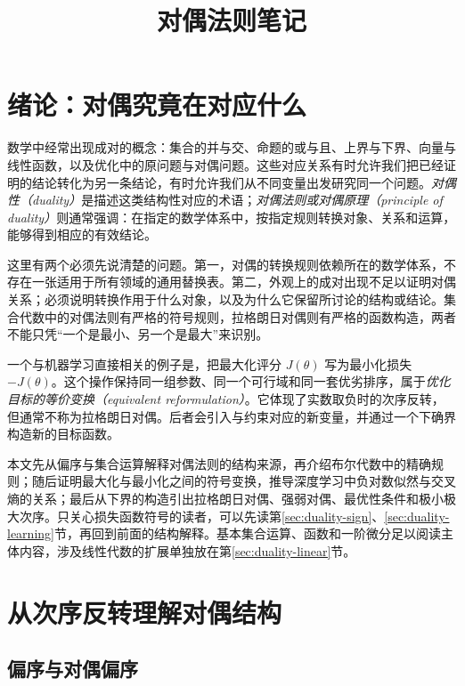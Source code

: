 \documentclass[UTF8,12pt,a4paper,fontset=fandol]{ctexart}
\title{对偶法则笔记}
\author{}
\date{}
\begin{document}
\maketitle
\tableofcontents

\section{绪论：对偶究竟在对应什么}
\label{sec:duality-introduction}

数学中经常出现成对的概念：集合的并与交、命题的或与且、上界与下界、向量与线性函数，以及优化中的原问题与对偶问题。这些对应关系有时允许我们把已经证明的结论转化为另一条结论，有时允许我们从不同变量出发研究同一个问题。\emph{对偶性（duality）}是描述这类结构性对应的术语；\emph{对偶法则或对偶原理（principle of duality）}则通常强调：在指定的数学体系中，按指定规则转换对象、关系和运算，能够得到相应的有效结论。

这里有两个必须先说清楚的问题。第一，对偶的转换规则依赖所在的数学体系，不存在一张适用于所有领域的通用替换表。第二，外观上的成对出现不足以证明对偶关系；必须说明转换作用于什么对象，以及为什么它保留所讨论的结构或结论。集合代数中的对偶法则有严格的符号规则，拉格朗日对偶则有严格的函数构造，两者不能只凭“一个是最小、另一个是最大”来识别。

一个与机器学习直接相关的例子是，把最大化评分 $J(\theta)$ 写为最小化损失 $-J(\theta)$。这个操作保持同一组参数、同一个可行域和同一套优劣排序，属于\emph{优化目标的等价变换（equivalent reformulation）}。它体现了实数取负时的次序反转，但通常不称为拉格朗日对偶。后者会引入与约束对应的新变量，并通过一个下确界构造新的目标函数。

本文先从偏序与集合运算解释对偶法则的结构来源，再介绍布尔代数中的精确规则；随后证明最大化与最小化之间的符号变换，推导深度学习中负对数似然与交叉熵的关系；最后从下界的构造引出拉格朗日对偶、强弱对偶、最优性条件和极小极大次序。只关心损失函数符号的读者，可以先读第\ref{sec:duality-sign}、\ref{sec:duality-learning}节，再回到前面的结构解释。基本集合运算、函数和一阶微分足以阅读主体内容，涉及线性代数的扩展单独放在第\ref{sec:duality-linear}节。

\section{从次序反转理解对偶结构}
\label{sec:duality-order}

\subsection{偏序与对偶偏序}
\end{document}
